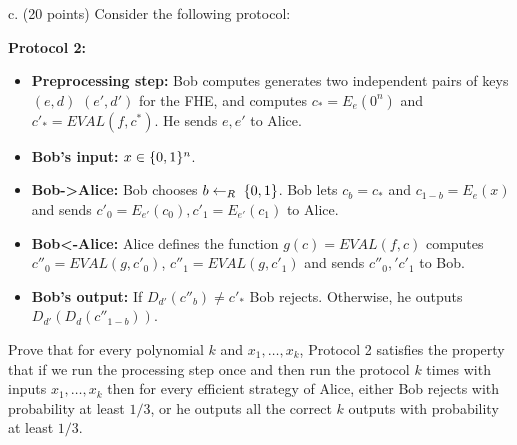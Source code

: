 \documentclass{article}
\begin{document}
\begin{enumerate}[noitemsep,topsep=\mdcompacttopsep,label=\alph*.]
c. (20 points) Consider the following protocol:%

\textbf{Protocol 2:}%

\begin{itemize}[noitemsep,topsep=\mdcompacttopsep]%

\item{}\textbf{Preprocessing step:} Bob computes generates two independent pairs of keys $(e,d)$ $(e',d')$ for the FHE, and computes $c_* = E_e(0^n)$ and $c'_*= EVAL(f,c^*)$. He sends $e,e'$ to Alice.%

\item{}\textbf{Bob's input:} $x\in\{0,1\}^n$.%

\item{}\textbf{Bob-\textgreater{}Alice:} Bob  chooses $b\leftarrow_R\;\{0,1\}$. Bob lets $c_b = c_*$ and $c_{1-b}=E_e(x)$ and sends $c'_0= E_{e'}(c_0),c'_1= E_{e'}(c_1)$ to Alice.%

\item{}\textbf{Bob\textless{}-Alice:} Alice defines the function $g(c)=EVAL(f,c)$  computes $c''_0=EVAL(g,c'_0)$, $c''_1=EVAL(g,c'_1)$  and sends $c''_0,'c'_1$ to Bob.%

\item{}\textbf{Bob's output:} If $D_{d'}(c''_b) \neq c'_*$ Bob rejects. Otherwise, he outputs $D_{d'}(D_d(c''_{1-b}))$.%
\end{itemize}%
Prove that for every polynomial $k$ and $x_1,\ldots,x_k$, Protocol 2 satisfies the property that if we run the processing step once and then run the protocol $k$ times with inputs  $x_1,\ldots,x_k$ then for every efficient strategy of Alice, either Bob rejects with probability at least $1/3$, or he outputs all the correct $k$ outputs with probability at least $1/3$.


\end{enumerate}
\end{document}
